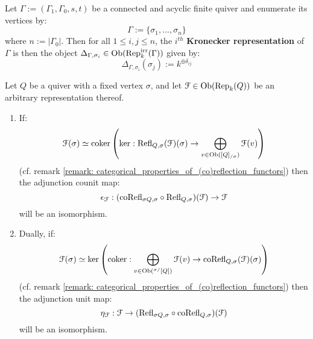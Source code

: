             \begin{convention} \label{conv: kronecker_representations}
                Let $\Gamma := (\Gamma_1, \Gamma_0, s, t)$ be a connected and acyclic finite quiver and enumerate its vertices by:
                    $$\Gamma := \{\sigma_1, ..., \sigma_n\}$$
                where $n := |\Gamma_0|$. Then for all $1 \leq i, j \leq n$, the $i^{th}$ \textbf{Kronecker representation} of $\Gamma$ is then the object $\Delta_{\Gamma, \sigma_i} \in \mathrm{Ob}(\mathrm{Rep}_k^{\mathrm{irr}}(\Gamma))$ given by:
                    $$\Delta_{\Gamma, \sigma_i}(\sigma_j) := k^{\oplus \delta_{ij}}$$
            \end{convention}
            \begin{lemma} \label{lemma: fixed_points_of_(co)reflection_adjunctions}
                Let $Q$ be a quiver with a fixed vertex $\sigma$, and let $\mathcal{F} \in \mathrm{Ob}(\mathrm{Rep}_k(Q))$ be an arbitrary representation thereof.
                    \begin{enumerate}
                        \item If:
                            $$\mathcal{F}(\sigma) \simeq \operatorname{coker} \left( \ker: \mathrm{Refl}_{Q, \sigma}(\mathcal{F})(\sigma) \to \bigoplus_{v \in \mathrm{Ob}([Q]_{/\sigma})} \mathcal{F}(v) \right)$$
                        (cf. remark \ref{remark: categorical_properties_of_(co)reflection_functors}) then the adjunction counit map:
                            $$\epsilon_{\mathcal{F}}: (\mathrm{co}\mathrm{Refl}_{\sigma Q, \sigma} \circ \mathrm{Refl}_{Q, \sigma})(\mathcal{F}) \to \mathcal{F}$$
                        will be an isomorphism.
                        \item Dually, if:
                            $$\mathcal{F}(\sigma) \simeq \ker \left( \operatorname{coker}: \bigoplus_{v \in \mathrm{Ob}({}^{\sigma/}[Q])} \mathcal{F}(v) \to \mathrm{co}\mathrm{Refl}_{Q, \sigma}(\mathcal{F})(\sigma) \right)$$
                        (cf. remark \ref{remark: categorical_properties_of_(co)reflection_functors}) then the adjunction unit map:
                            $$\eta_{\mathcal{F}}: \mathcal{F} \to (\mathrm{Refl}_{\sigma Q, \sigma} \circ \mathrm{co}\mathrm{Refl}_{Q, \sigma})(\mathcal{F})$$
                        will be an isomorphism.
                    \end{enumerate}
            \end{lemma}
